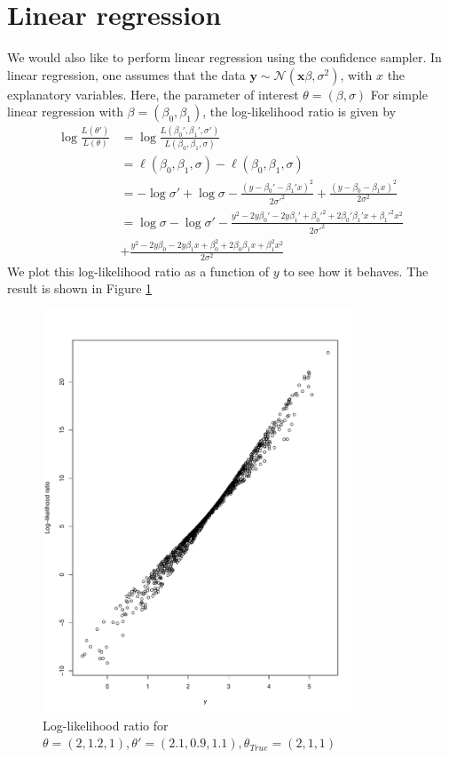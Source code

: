 {\section{Linear regression}
We would also like to perform linear regression using the confidence sampler. In linear regression, one assumes that the data $\mathbf{y} \sim \mathcal{N}\left(\mathbf{x}\beta, \sigma^2\right)$,
with $x$ the explanatory variables. Here, the parameter of interest $\theta = \left(\beta, \sigma\right)$    
For simple linear regression with $\beta = \left(\beta_0, \beta_1\right)$, the log-likelihood ratio is given by 
\begin{equation}
\begin{split}
    \log \frac{L\left(\theta'\right)}{L\left(\theta\right)} &= \log \frac{L\left(\beta_0', \beta_1', \sigma'\right)}{L\left(\beta_0, \beta_1, \sigma\right)}  \\
    & = \ell\left(\beta_0, \beta_1, \sigma\right) - \ell\left(\beta_0, \beta_1, \sigma\right) \\
    & = -\log\sigma' + \log\sigma - \frac{\left(y - \beta_0' - \beta_1'x\right)^2}{2\sigma'^2} + \frac{\left(y - \beta_0 - \beta_1x\right)^2}{2\sigma^2} \\
    & = \log \sigma - \log \sigma' - \frac{y^2 - 2y\beta_0'  - 2y\beta_1' + \beta_0'^2 + 2\beta_0'\beta_1'x + \beta_1'^2x^2 }{2\sigma'^2} \\ &+ \frac{y^2 - 2y\beta_0 - 2y\beta_1x + \beta_0^2 + 2\beta_0\beta_1x + \beta_1^2x^2}{2\sigma^2}
    \end{split}
\end{equation}
We plot this log-likelihood ratio as a function of $y$ to see how it behaves. The result is shown in Figure \ref{fig:loglik_ratio_linear_regression} 
\begin{figure}[H]
    \centering
    \includegraphics[scale = 0.7, height = 12cm]{figures/loglik_ratio_lin_reg.pdf}
    \caption{Log-likelihood ratio for $\theta = \left(2,1.2,  1\right), \theta' = \left(2.1, 0.9, 1.1\right), \theta_{True} = \left(2,1,1\right)$}
    \label{fig:loglik_ratio_linear_regression}
\end{figure}{}

}
